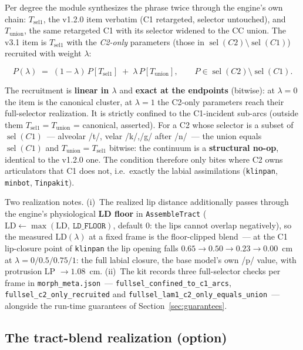 \documentclass[11pt,a4paper]{article}
\newcommand{\lam}{\lambda}
\newcommand{\code}[1]{\texttt{#1}}
\newcommand{\sectref}[1]{Section~\ref{#1}}
\begin{document}
Per degree the module synthesizes the phrase twice through the
engine's own chain: $T_{\mathrm{sel1}}$, the v1.2.0 item verbatim (C1
retargeted, selector untouched), and $T_{\mathrm{union}}$, the same
retargeted C1 with its selector widened to the CC union.  The v3.1
item is $T_{\mathrm{sel1}}$ with the \emph{C2-only} parameters
(those in $\operatorname{sel}(C2) \setminus \operatorname{sel}(C1)$)
recruited with weight $\lam$:

\begin{equation}\label{eq:fullsel}
P(\lam) \;=\; (1-\lam)\, P\!\left[T_{\mathrm{sel1}}\right]
\;+\; \lam\, P\!\left[T_{\mathrm{union}}\right],
\qquad P \in \operatorname{sel}(C2) \setminus \operatorname{sel}(C1).
\end{equation}

The recruitment is \textbf{linear in $\lam$} and \textbf{exact at the
endpoints} (bitwise): at $\lam = 0$ the item is the canonical
cluster, at $\lam = 1$ the C2-only parameters reach their
full-selector realization.  It is strictly confined to the
C1-incident sub-arcs (outside them
$T_{\mathrm{sel1}} = T_{\mathrm{union}}$ = canonical, asserted).  For
a C2 whose selector is a subset of $\operatorname{sel}(C1)$~---
alveolar /t/, velar /k/,/g/ after /n/~--- the union equals
$\operatorname{sel}(C1)$ and
$T_{\mathrm{union}} = T_{\mathrm{sel1}}$ bitwise: the continuum is a
\textbf{structural no-op}, identical to the v1.2.0 one.  The
condition therefore only bites where C2 owns articulators that C1
does not, i.e.\ exactly the labial assimilations (\code{klinpan},
\code{minbot}, \code{Tinpakit}).

Two realization notes.  (i)~The realized lip distance additionally
passes through the engine's physiological \textbf{LD floor} in
\code{AssembleTract}
($\mathrm{LD} \leftarrow \max(\mathrm{LD},\ \code{LD\_FLOOR})$,
default $0$: the lips cannot overlap negatively), so the measured
$\mathrm{LD}(\lam)$ at a fixed frame is the floor-clipped blend~---
at the C1 lip-closure point of \code{klinpan} the lip opening falls
$0.65 \to 0.50 \to 0.23 \to \mathbf{0.00}$~cm at
$\lam = 0/0.5/0.75/1$: the full labial closure, the base model's own
/p/ value, with protrusion LP $\to 1.08$~cm.  (ii)~The kit records
three full-selector checks per frame in \code{morph\_meta.json}~---
\code{fullsel\_confined\_to\_c1\_arcs},
\code{fullsel\_c2\_only\_recruited} and
\code{fullsel\_lam1\_c2\_only\_equals\_union}~--- alongside the
run-time guarantees of \sectref{sec:guarantees}.

\subsection{The tract-blend realization (option)}\label{sec:blendrule}
\end{document}
